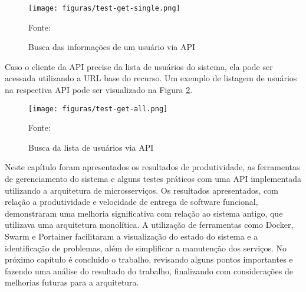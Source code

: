 \begin{figure}[H]
	\centering
	\caption{Busca das informações de um usuário via API}
	\texttt{[image: figuras/test-get-single.png]}

	\label{fig:test-get-single}
	\footnotesize Fonte: \fonteOAutor
\end{figure}

Caso o cliente da \ac{API} precise da lista de usuários do sistema, ela pode
ser acessada utilizando a \ac{URL} base do recurso. Um exemplo de listagem
de usuários na respectiva \ac{API} pode ser visualizado na Figura
\ref{fig:test-get-all}.

\begin{figure}[H]
	\centering
	\caption{Busca da lista de usuários via API}
	\texttt{[image: figuras/test-get-all.png]}

	\label{fig:test-get-all}
	\footnotesize Fonte: \fonteOAutor
\end{figure}

Neste capítulo foram apresentados os resultados de produtividade, as
ferramentas de gerenciamento do sistema e alguns testes práticos
com uma \ac{API} implementada utilizando a arquitetura de microsserviços.
Os resultados apresentados, com relação a produtividade e velocidade de
entrega de software funcional, demonstraram uma melhoria significativa
com relação ao sistema antigo, que utilizava uma arquitetura monolítica.
A utilização de ferramentas como Docker, Swarm e Portainer facilitaram
a visualização do estado do sistema e a identificação de problemas,
além de simplificar a manutenção dos serviços. No próximo capítulo é
concluido o trabalho, revisando alguns pontos importantes e fazendo
uma análise do resultado do trabalho, finalizando com considerações
de melhorias futuras para a arquitetura.
